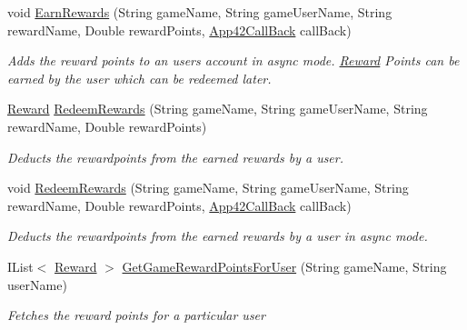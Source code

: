 \begin{DoxyCompactItemize}
void \hyperlink{classcom_1_1shephertz_1_1app42_1_1paas_1_1sdk_1_1csharp_1_1reward_1_1_reward_service_aed72ee3635921da662b8ffe7dd207fda}{Earn\+Rewards} (String game\+Name, String game\+User\+Name, String reward\+Name, Double reward\+Points, \hyperlink{interfacecom_1_1shephertz_1_1app42_1_1paas_1_1sdk_1_1csharp_1_1_app42_call_back}{App42\+Call\+Back} call\+Back)
\begin{DoxyCompactList}\small\item\em Adds the reward points to an users account in async mode. \hyperlink{classcom_1_1shephertz_1_1app42_1_1paas_1_1sdk_1_1csharp_1_1reward_1_1_reward}{Reward} Points can be earned by the user which can be redeemed later. \end{DoxyCompactList}\item 
\hyperlink{classcom_1_1shephertz_1_1app42_1_1paas_1_1sdk_1_1csharp_1_1reward_1_1_reward}{Reward} \hyperlink{classcom_1_1shephertz_1_1app42_1_1paas_1_1sdk_1_1csharp_1_1reward_1_1_reward_service_a4289f36ada5dfc5d962e133da988632b}{Redeem\+Rewards} (String game\+Name, String game\+User\+Name, String reward\+Name, Double reward\+Points)
\begin{DoxyCompactList}\small\item\em Deducts the rewardpoints from the earned rewards by a user. \end{DoxyCompactList}\item 
void \hyperlink{classcom_1_1shephertz_1_1app42_1_1paas_1_1sdk_1_1csharp_1_1reward_1_1_reward_service_a40b85bc8eec385b36e53ce2a407fd92e}{Redeem\+Rewards} (String game\+Name, String game\+User\+Name, String reward\+Name, Double reward\+Points, \hyperlink{interfacecom_1_1shephertz_1_1app42_1_1paas_1_1sdk_1_1csharp_1_1_app42_call_back}{App42\+Call\+Back} call\+Back)
\begin{DoxyCompactList}\small\item\em Deducts the rewardpoints from the earned rewards by a user in async mode. \end{DoxyCompactList}\item 
I\+List$<$ \hyperlink{classcom_1_1shephertz_1_1app42_1_1paas_1_1sdk_1_1csharp_1_1reward_1_1_reward}{Reward} $>$ \hyperlink{classcom_1_1shephertz_1_1app42_1_1paas_1_1sdk_1_1csharp_1_1reward_1_1_reward_service_a8ec3949aa7cefcfa0d37331a8304a037}{Get\+Game\+Reward\+Points\+For\+User} (String game\+Name, String user\+Name)
\begin{DoxyCompactList}\small\item\em Fetches the reward points for a particular user \end{DoxyCompactList}\item 

\end{DoxyCompactItemize}
